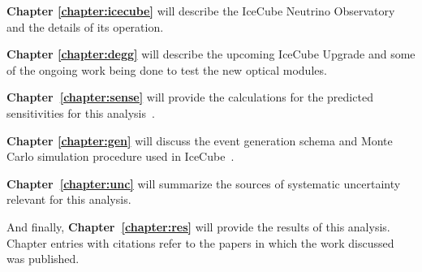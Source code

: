 \documentclass[main.tex]{subfiles}
\begin{document}
\textbf{Chapter \ref{chapter:icecube}} will describe the IceCube Neutrino Observatory and the details of its operation. 

\textbf{Chapter \ref{chapter:degg}} will describe the upcoming IceCube Upgrade and some of the ongoing work being done to test the new optical modules.

\textbf{Chapter~\ref{chapter:sense}} will provide the calculations for the predicted sensitivities for this analysis~\cite{PhysRevD.105.052001}. 

\textbf{Chapter \ref{chapter:gen}} will discuss the event generation schema and Monte Carlo simulation procedure used in IceCube~\cite{ABBASI2021108018}.

\textbf{Chapter~\ref{chapter:unc}} will summarize the sources of systematic uncertainty relevant for this analysis.

And finally,\textbf{ Chapter~\ref{chapter:res}} will provide the results of this analysis. 
Chapter entries with citations refer to the papers in which the work discussed was published.
\end{document}
